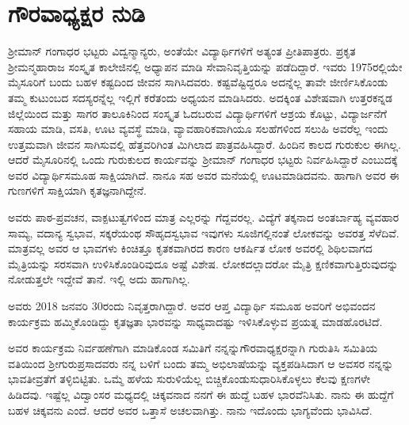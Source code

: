 {\fontsize{14}{16}\selectfont
\chapter{ಗೌರವಾಧ್ಯಕ್ಷರ ನುಡಿ}

ಶ್ರೀಮಾನ್ ಗಂಗಾಧರ ಭಟ್ಟರು ವಿದ್ವನ್ಮಾನ್ಯರು, ಅಂತೆಯೇ ವಿದ್ಯಾರ್ಥಿಗಳಿಗೆ ಅತ್ಯಂತ ಪ್ರೀತಿಪಾತ್ರರು. ಪ್ರಕೃತ ಶ್ರೀಮನ್ಮಹಾರಾಜ ಸಂಸ್ಕೃತ ಕಾಲೇಜಿನಲ್ಲಿ ಅಧ್ಯಾಪನ ಮಾಡಿ ಸೇವಾನಿವೃತ್ತಿಯನ್ನು ಪಡೆದಿದ್ದಾರೆ. ಇವರು 1975ರಲ್ಲಿಯೇ ಮೈಸೂರಿಗೆ ಬಂದು ಬಹಳ ಕಷ್ಟದಿಂದ ಜೀವನ ಸಾಗಿಸಿದವರು. ಕಷ್ಟವೆಷ್ಟಿದ್ದರೂ ಅದನ್ನೆಲ್ಲ ತಾವೇ ಜೀರ್ಣಿಸಿಕೊಂಡು ತಮ್ಮ ಕುಟುಂಬದ ಸದಸ್ಯರನ್ನೆಲ್ಲ ಇಲ್ಲಿಗೆ ಕರೆತಂದು ಅಧ್ಯಯನ ಮಾಡಿಸಿದರು. ಅದಕ್ಕಿಂತ ವಿಶೇಷವಾಗಿ ಉತ್ತರಕನ್ನಡ ಜಿಲ್ಲೆಯಿಂದ ಮತ್ತು ಸಾಗರ ತಾಲೂಕಿನಿಂದ ಸಂಸ್ಕೃತ ಓದಬರುವ ವಿದ್ಯಾರ್ಥಿಗಳಿಗೆ ಆಶ್ರಯ ಕೊಟ್ಟು, ವಿದ್ಯಾರ್ಜನೆಗೆ ಸಹಾಯ ಮಾಡಿ, ವಸತಿ, ಊಟ ವ್ಯವಸ್ಥೆ ಮಾಡಿ, ವ್ಯಾವಹಾರಿಕವಾಗಿಯೂ ಸಲಹೆಗಳಿಂದ ಸಲುಹಿ ಅವರೆಲ್ಲ ಇಂದು ಉತ್ತಮವಾಗಿ ಜೀವನ ಸಾಗಿಸುವಲ್ಲಿ ಹೆತ್ತವರಿಗಿಂತ ಮಿಗಿಲಾದ ಪಾತ್ರ\-ವಹಿಸಿದ್ದಾರೆ. ಹಿಂದಿನ ಕಾಲದ ಗುರುಕುಲ ಈಗಿಲ್ಲ. ಆದರೆ ಮೈಸೂರಿನಲ್ಲಿ ಒಂದು ಗುರುಕುಲದ ಕಾರ್ಯವನ್ನು ಶ್ರೀಮಾನ್ ಗಂಗಾಧರ ಭಟ್ಟರು ನಿರ್ವಹಿಸಿದ್ದಾರೆ ಎಂಬುದಕ್ಕೆ ಅವರ ವಿದ್ಯಾರ್ಥಿಸಮೂಹ ಸಾಕ್ಷಿಯಾಗಿದೆ. ನಾನೂ ಸಹ ಅವರ ಮನೆಯಲ್ಲಿ ಊಟಮಾಡಿದವನು. ಹಾಗಾಗಿ ಅವರ ಈ ಗುಣಗಳಿಗೆ ಸಾಕ್ಷಿಯಾಗಿ ಕೃತಜ್ಞನಾಗಿದ್ದೇನೆ.
	
ಅವರು ಪಾಠ-ಪ್ರವಚನ, ವಾಕ್ಪಟುತ್ವಗಳಿಂದ ಮಾತ್ರ ಎಲ್ಲರನ್ನು ಗೆದ್ದವರಲ್ಲ. ವಿದ್ಯೆಗೆ ತಕ್ಕನಾದ ಅಂತರ್ಬಾಹ್ಯ ವ್ಯವಹಾರ ಸಾಮ್ಯ, ವದಾನ್ಯ ಸ್ವಭಾವ, ಸಕ್ಕರೆಯಂಥ ಸೌಹೃದಸ್ವಭಾವ ಇವುಗಳು ಸೂಜಿಗಲ್ಲಿನಂತೆ ಲೋಕವನ್ನು ಅವರತ್ತ ಸೆಳೆದಿವೆ. ಮಾತ್ರವಲ್ಲ ಅವರ ಆ ಭಾವಗಳು ಕಿಂಚಿತ್ತೂ ಕೃತಕವಾಗಿರದ ಕಾರಣ ಆಕರ್ಷಿತ ಲೋಕ ಅವರಲ್ಲಿ ಶಿಥಿಲವಾಗದ ಮೈತ್ರಿಯನ್ನು ಸರಸವಾಗಿ ಉಳಿಸಿಕೊಂಡಿರಿವುದೂ ಅಷ್ಟೆ ವಿಶೇಷ. ಲೋಕದಲ್ಲಾದರೋ ಮೈತ್ರಿ ಕ್ಷಣಿಕವಾಗುತ್ತಿರುವುದನ್ನು ನೋಡುತ್ತಲೇ ಇದ್ದೇವೆ ತಾನೆ. ಇಲ್ಲಿ ಅದು ಹಾಗಾಗಿಲ್ಲ.
 
ಅವರು 2018 ಜನವರಿ 30ರಂದು ನಿವೃತ್ತರಾಗಿದ್ದಾರೆ. ಅವರ ಆಪ್ತ ವಿದ್ಯಾರ್ಥಿ ಸಮೂಹ ಅವರಿಗೆ ಅಭಿವಂದನ ಕಾರ್ಯಕ್ರಮ ಹಮ್ಮಿಕೊಂಡಿದ್ದು ಕೃತಜ್ಞತಾ ಭಾರವನ್ನು ಸಾಧ್ಯವಾದಷ್ಟು ಇಳಿಸಿಕೊಳ್ಳುವ ಪ್ರಯತ್ನ ಮಾಡಹೊರಟಿದೆ. 
\newpage

ಅವರ ಕಾರ್ಯಕ್ರಮ ನಿರ್ವಹಣೆಗಾಗಿ ಮಾಡಿಕೊಂಡ ಸಮಿತಿಗೆ ನನ್ನನ್ನು\break ಗೌರವಾಧ್ಯಕ್ಷರನ್ನಾಗಿ ಗುರುತಿಸಿ ಸಮಿತಿಯ ವತಿಯಿಂದ ಶ್ರೀಗುರುಪ್ರಸಾದವರು ನನ್ನ ಬಳಿಗೆ ಬಂದು ತಮ್ಮ ಅಭಿಲಾಷೆಯನ್ನು ವ್ಯಕ್ತಪಡಿಸಿದಾಗ ಆ ಅವಸರ ನನ್ನನ್ನು ಭಾವತೀವ್ರತೆಗೆ ತಳ್ಳಿಬಿಟ್ಟಿತು. ಒಮ್ಮೆ ಹಳೆಯ ಸುರುಳಿಯೆಲ್ಲ ಬಿಚ್ಚಿಕೊಂಡು\break ಸುಧಾರಿಸಿಕೊಳ್ಳಲು ಕೆಲವು ಕ್ಷಣಗಳೇ ಹಿಡಿದವು. ಇಷ್ಟೆಲ್ಲ ವಿದ್ವಾಂಸರ ಮಧ್ಯದಲ್ಲಿ ಚಿಕ್ಕವನಾದ ನನಗೆ ಈ ಹುದ್ದೆ ಬಹಳ ಭಾರವೆನಿಸಿತು. ನಾನು ಈ ಹುದ್ದೆಗೆ ಬಹಳ ಚಿಕ್ಕವನು ಎಂದೆ. ಆದರೆ ಅವರ ಒತ್ತಾಸೆ ಅಚಲವಾಗಿತ್ತು. ನಾನು ಇದೊಂದು ಭಾಗ್ಯವೆಂದು ಭಾವಿಸಿದೆ.

}
